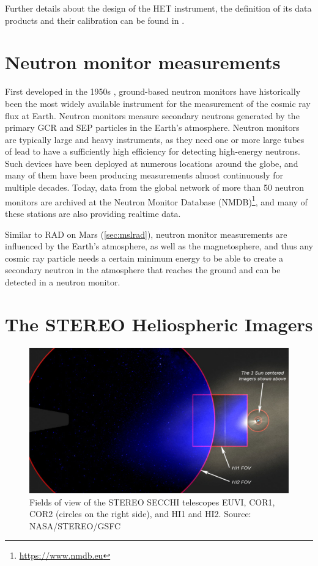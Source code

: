 Further details about the design of the \ac{HET} instrument, the definition of its data products and their calibration can be found in \citet{Elftmann-2020-PhD}. 

\section{Neutron monitor measurements}
\label{sec:neutronmonitors}

First developed in the 1950s \citep[see e.g.][]{Simpson-2000}, ground-based neutron monitors have historically been the most widely available instrument for the measurement of the cosmic ray flux at Earth. Neutron monitors measure secondary neutrons generated by the primary \ac{GCR} and \ac{SEP} particles in the Earth's atmosphere. Neutron monitors are typically large and heavy instruments, as they need one or more large tubes of lead to have a sufficiently high efficiency for detecting high-energy neutrons. Such devices have been deployed at numerous locations around the globe, and many of them have been producing measurements almost continuously for multiple decades. Today, data from the global network of more than 50 neutron monitors \citep[e.g.][]{Moraal-2000} are archived at the Neutron Monitor Database (NMDB)\footnote{\url{https://www.nmdb.eu}}, and many of these stations are also providing realtime data.

Similar to \ac{RAD} on Mars (\autoref{sec:mslrad}), neutron monitor measurements are influenced by the Earth's atmosphere, as well as the magnetosphere, and thus any cosmic ray particle needs a certain minimum energy to be able to create a secondary neutron in the atmosphere that reaches the ground and can be detected in a neutron monitor.


\section{The STEREO Heliospheric Imagers}
\label{sec:stereohi}

\begin{figure}
    \centering
    \includegraphics[width=0.8\linewidth]{images/secchi_fov}
    \caption[Fields of view of the \acs{STEREO} SECCHI telescopes]{Fields of view of the \ac{STEREO} SECCHI telescopes EUVI, COR1, COR2 (circles on the right side), and HI1 and HI2. Source: NASA/STEREO/GSFC}
    \label{fig:secchifov}
\end{figure}
